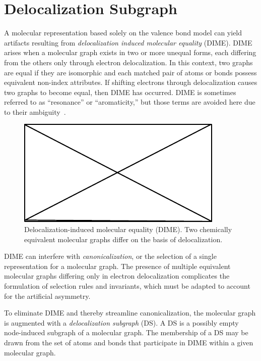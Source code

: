 \documentclass{article}
\begin{document}
\section*{Delocalization Subgraph}

A molecular representation based solely on the valence bond model can yield artifacts resulting from \textit{delocalization induced molecular equality} (DIME). DIME arises when a molecular graph exists in two or more unequal forms, each differing from the others only through electron delocalization. In this context, two graphs are equal if they are isomorphic and each matched pair of atoms or bonds possess equivalent non-index attributes. If shifting electrons through delocalization causes two graphs to become equal, then DIME has occurred. DIME is sometimes referred to as \enquote{resonance} or \enquote{aromaticity,} but those terms are avoided here due to their ambiguity~\cite{randic:2018,kerber:2006}.

\begin{figure}
    \centering
    \includegraphics{filler}
    \caption{Delocalization-induced molecular equality (DIME). Two chemically equivalent molecular graphs differ on the basis of delocalization.}
    \label{fig:dime}
\end{figure}

DIME can interfere with \textit{canonicalization}, or the selection of a single representation for a molecular graph. The presence of multiple equivalent molecular graphs differing only in electron delocalization complicates the formulation of selection rules and invariants, which must be adapted to account for the artificial asymmetry.

To eliminate DIME and thereby streamline canonicalization, the molecular graph is augmented with a \textit{delocalization subgraph} (DS). A DS is a possibly empty node-induced subgraph of a molecular graph. The membership of a DS may be drawn from the set of atoms and bonds that participate in DIME within a given molecular graph.
\end{document}
